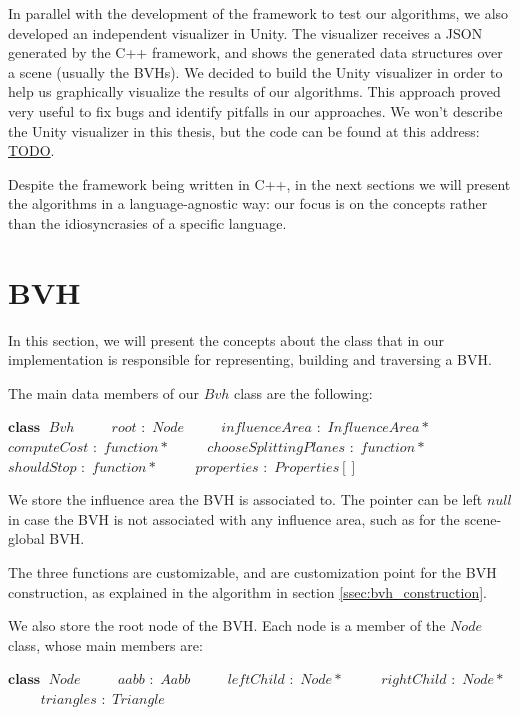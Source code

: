\documentclass{PoliMi_MasterThesis}
\newcommand*\Class[1]{\State $\textbf{class} \;$ #1}
\newcommand*\Member[2]{\State $\qquad$ #1 $:$ #2}
\begin{document}
In parallel with the development of the framework to test our algorithms, we also developed an independent visualizer in Unity. The visualizer receives a JSON generated by the C++ framework, and shows the generated data structures over a scene (usually the BVHs). We decided to build the Unity visualizer in order to help us graphically visualize the results of our algorithms. This approach proved very useful to fix bugs and identify pitfalls in our approaches. We won't describe the Unity visualizer in this thesis, but the code can be found at this address: \url{TODO}.

Despite the framework being written in C++, in the next sections we will present the algorithms in a language-agnostic way: our focus is on the concepts rather than the idiosyncrasies of a specific language.

\section{BVH} \label{sec:bvh}
In this section, we will present the concepts about the class that in our implementation is responsible for representing, building and traversing a BVH.

The main data members of our $Bvh$ class are the following:
\begin{algorithm}[H]
	\begin{algorithmic}
		\Class{$Bvh$}
		\Member{$root$}{$Node$}
		\Member{$influenceArea$}{$InfluenceArea*$}
		\Member{$computeCost$}{$function*$}
		\Member{$chooseSplittingPlanes$}{$function*$}
		\Member{$shouldStop$}{$function*$}
		\Member{$properties$}{$Properties[]$}
	\end{algorithmic}
\end{algorithm} 

We store the influence area the BVH is associated to. The pointer can be left $null$ in case the BVH is not associated with any influence area, such as for the scene-global BVH.

The three functions are customizable, and are customization point for the BVH construction, as explained in the algorithm in section \ref{ssec:bvh_construction}.

We also store the root node of the BVH. Each node is a member of the $Node$ class, whose main members are:
\begin{algorithm}[H]
	\begin{algorithmic}
		\Class{$Node$}
		\Member{$aabb$}{$Aabb$}
		\Member{$leftChild$}{$Node*$}
		\Member{$rightChild$}{$Node*$}
		\Member{$triangles$}{$Triangle$}
	\end{algorithmic}
\end{algorithm} 
\end{document}
